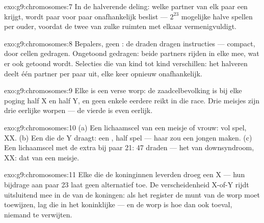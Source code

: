 \begin{solution}{exo:g9:chromosomes:7}
In de halverende deling: welke partner van elk paar een
 krijgt, wordt paar voor paar onafhankelijk beslist
--- $2^{23}$ mogelijke halve spellen per ouder, voordat de
 twee van zulke ruimten met elkaar vermenigvuldigt.
\end{solution}

\begin{solution}{exo:g9:chromosomes:8}
Bepalers, geen : de draden dragen instructies ---
compact, door cellen gedragen. Ongetoond gedragen: beide
partners rijden in elke  mee, wat er ook getoond wordt.
Selecties die van kind tot kind verschillen: het halveren deelt
één partner per paar uit, elke keer opnieuw onafhankelijk.
\end{solution}

\begin{solution}{exo:g9:chromosomes:9}
Elke  is een verse worp: de zaadcelbevolking is bij
elke poging half X en half Y, en geen enkele eerdere 
reikt in die race. Drie meisjes zijn drie eerlijke worpen ---
de vierde is even eerlijk.
\end{solution}

\begin{solution}{exo:g9:chromosomes:10}
(a) Een lichaamscel van een meisje of vrouw: vol spel, XX. (b)
Een  die de Y draagt: een , half spel ---
haar  zou een jongen maken. (c) Een lichaamscel met
de extra bij paar 21: 47 draden --- het  van
downsyndroom, XX: dat van een meisje.
\end{solution}

\begin{solution}{exo:g9:chromosomes:11}
Elke  die de koninginnen leverden droeg een X --- hun
bijdrage aan paar 23 laat geen alternatief toe. De
verscheidenheid X-of-Y rijdt uitsluitend mee in de
 van de koningen: als het register de munt van de
worp moet toewijzen, lag die in het koninklijke  --- en de
worp is hoe dan ook toeval, niemand te verwijten.
\end{solution}

